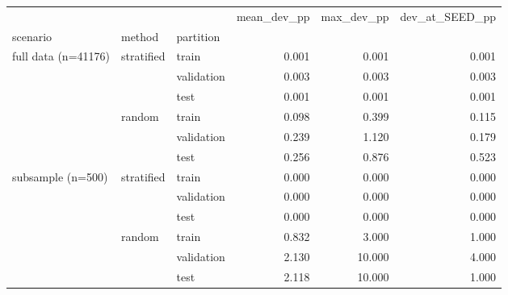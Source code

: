 \begin{tabular}{lllrrr}
\toprule
 &  &  & mean\_dev\_pp & max\_dev\_pp & dev\_at\_SEED\_pp \\
scenario & method & partition &  &  &  \\
\midrule
\multirow[t]{6}{*}{full data (n=41176)} & \multirow[t]{3}{*}{stratified} & train & 0.001 & 0.001 & 0.001 \\
 &  & validation & 0.003 & 0.003 & 0.003 \\
 &  & test & 0.001 & 0.001 & 0.001 \\
\cline{2-6}
 & \multirow[t]{3}{*}{random} & train & 0.098 & 0.399 & 0.115 \\
 &  & validation & 0.239 & 1.120 & 0.179 \\
 &  & test & 0.256 & 0.876 & 0.523 \\
\cline{1-6} \cline{2-6}
\multirow[t]{6}{*}{subsample (n=500)} & \multirow[t]{3}{*}{stratified} & train & 0.000 & 0.000 & 0.000 \\
 &  & validation & 0.000 & 0.000 & 0.000 \\
 &  & test & 0.000 & 0.000 & 0.000 \\
\cline{2-6}
 & \multirow[t]{3}{*}{random} & train & 0.832 & 3.000 & 1.000 \\
 &  & validation & 2.130 & 10.000 & 4.000 \\
 &  & test & 2.118 & 10.000 & 1.000 \\
\cline{1-6} \cline{2-6}
\bottomrule
\end{tabular}
